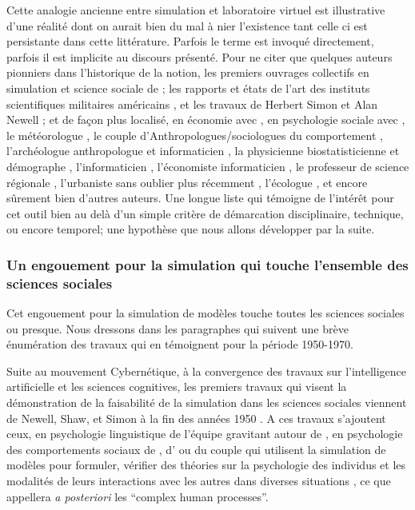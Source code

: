 Cette analogie ancienne entre simulation et laboratoire virtuel est illustrative d'une réalité dont on aurait bien du mal à nier l'existence tant celle ci est persistante dans cette littérature. Parfois le terme est invoqué directement, parfois il est implicite au discours présenté. Pour ne citer que quelques auteurs pionniers  dans l'historique de la notion, les premiers ouvrages collectifs en simulation et science sociale de \textcite{Borko1962, Guetzkow1962, Guetzkow1972} ; les rapports et états de l'art des instituts scientifiques militaires américains \autocite{Harman1961}, et les travaux de Herbert Simon et Alan Newell \autocite{Newell1961}; et de façon plus localisé, en économie avec \textcite[915]{Shubik1960b}, en psychologie sociale avec \textcite{Abelson1968} , le météorologue \textcite{Fleisher1965}, le couple d'Anthropologues/sociologues du comportement \textcite{Gullahorn1965}, l'archéologue anthropologue et informaticien \textcite{Doran1970}, la physicienne biostatisticienne et démographe \textcite{Sheps1971}, l'informaticien \textcite[3-4]{Forrester1971}, l'économiste informaticien \textcite{Naylor1966}, le professeur de science régionale \textcite[271]{Harris1966}, l'urbaniste \textcite[295]{Batty1976} sans oublier plus récemment \textcite{Epstein1996}, l'écologue \textcite{Grimm2006}, et encore sûrement bien d'autres auteurs. Une longue liste qui témoigne de l'intérêt pour cet outil bien au delà d'un simple critère de démarcation disciplinaire, technique, ou encore temporel; une hypothèse que nous allons développer par la suite.

\subsubsection{Un engouement pour la simulation qui touche l'ensemble des sciences sociales}
\label{ssec:engouement_sciencesociale}

Cet engouement pour la simulation de modèles touche toutes les sciences sociales ou presque. Nous dressons dans les paragraphes qui suivent une brève énumération des travaux qui en témoignent pour la période 1950-1970.

Suite au mouvement Cybernétique, à la convergence des travaux sur l'intelligence artificielle et les sciences cognitives, les premiers travaux qui visent la démonstration de la faisabilité de la simulation dans les sciences sociales viennent de Newell, Shaw, et Simon à la fin des années 1950 \autocite{Gullahorn1965} . A ces travaux s'ajoutent ceux, en psychologie linguistique de l'équipe gravitant autour de \textcite[280-416]{Borko1962}, en psychologie des comportements sociaux de \textcite{Hovland1960}, d'\textcites{Abelson1961, Abelson1968} ou du couple \textcite{Gullahorn1965a} qui utilisent la simulation de modèles pour formuler, vérifier des théories sur la psychologie des individus et les modalités de leurs interactions avec les autres dans diverses situations , ce que \textcite{Ostrom1988} appellera \textit{a posteriori} les \foreignquote{english}{complex human processes}.

